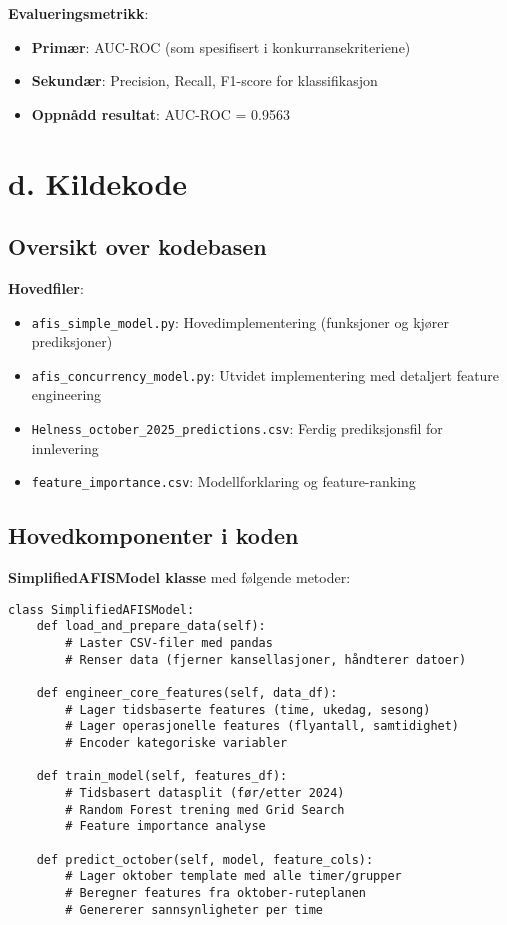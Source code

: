\documentclass[11pt,a4paper]{article}
\begin{document}
\textbf{Evalueringsmetrikk}:
\begin{itemize}
    \item \textbf{Primær}: AUC-ROC (som spesifisert i konkurransekriteriene)
    \item \textbf{Sekundær}: Precision, Recall, F1-score for klassifikasjon
    \item \textbf{Oppnådd resultat}: AUC-ROC = 0.9563
\end{itemize}

\section{d. Kildekode}

\subsection{Oversikt over kodebasen}

\textbf{Hovedfiler}:
\begin{itemize}
    \item \texttt{afis\_simple\_model.py}: Hovedimplementering (funksjoner og kjører prediksjoner)
    \item \texttt{afis\_concurrency\_model.py}: Utvidet implementering med detaljert feature engineering
    \item \texttt{Helness\_october\_2025\_predictions.csv}: Ferdig prediksjonsfil for innlevering
    \item \texttt{feature\_importance.csv}: Modellforklaring og feature-ranking
\end{itemize}

\subsection{Hovedkomponenter i koden}

\textbf{SimplifiedAFISModel klasse} med følgende metoder:

\begin{lstlisting}[caption=Hovedstruktur]
class SimplifiedAFISModel:
    def load_and_prepare_data(self):
        # Laster CSV-filer med pandas
        # Renser data (fjerner kansellasjoner, håndterer datoer)

    def engineer_core_features(self, data_df):
        # Lager tidsbaserte features (time, ukedag, sesong)
        # Lager operasjonelle features (flyantall, samtidighet)
        # Encoder kategoriske variabler

    def train_model(self, features_df):
        # Tidsbasert datasplit (før/etter 2024)
        # Random Forest trening med Grid Search
        # Feature importance analyse

    def predict_october(self, model, feature_cols):
        # Lager oktober template med alle timer/grupper
        # Beregner features fra oktober-ruteplanen
        # Genererer sannsynligheter per time
\end{lstlisting}
\end{document}
